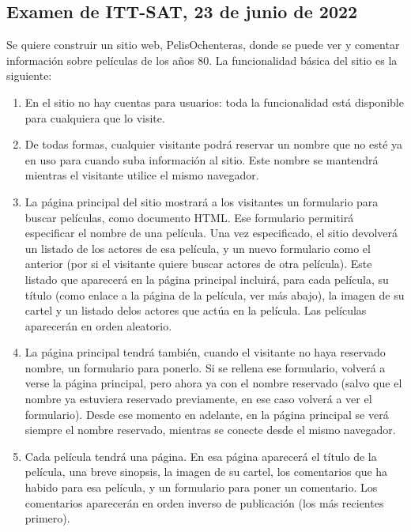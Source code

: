 \subsection{Examen de ITT-SAT, 23 de junio de 2022}

Se quiere construir un sitio web, PelisOchenteras, donde se puede ver y comentar información sobre películas de los años 80. La funcionalidad básica del sitio es la siguiente:

\begin{enumerate}
\item En el sitio no hay cuentas para usuarios: toda la funcionalidad está disponible para cualquiera que lo visite.
\item De todas formas, cualquier visitante podrá reservar un nombre que no esté ya en uso para cuando suba información al sitio. Este nombre se mantendrá mientras el visitante utilice el mismo navegador.
\item La página principal del sitio mostrará a los visitantes un formulario para buscar películas, como documento HTML. Ese formulario permitirá especificar el nombre de una película. Una vez especificado, el sitio devolverá un listado de los actores de esa película, y un nuevo formulario como el anterior (por si el visitante quiere buscar actores de otra película). Este listado que aparecerá en la página principal incluirá, para cada película, su título (como enlace a la página de la película, ver más abajo), la imagen de su cartel y un listado delos actores que actúa en la película. Las películas aparecerán en orden aleatorio.
\item La página principal tendrá también, cuando el visitante no haya reservado nombre, un formulario para ponerlo. Si se rellena ese formulario, volverá a verse la página principal, pero ahora ya con el nombre reservado (salvo que el nombre ya estuviera reservado previamente, en ese caso volverá a ver el formulario). Desde ese momento en adelante, en la página principal se verá siempre el nombre reservado, mientras se conecte desde el mismo navegador.
\item Cada película tendrá una página. En esa página aparecerá el título de la película, una breve sinopsis, la imagen de su cartel, los comentarios que ha habido para esa película, y un formulario para poner un comentario. Los comentarios aparecerán en orden inverso de publicación (los más recientes primero).

\end{enumerate}
